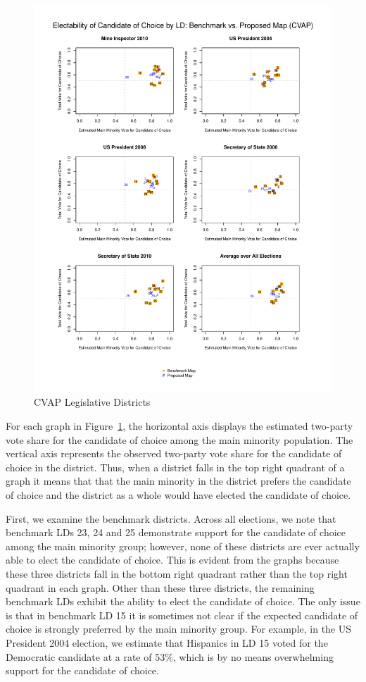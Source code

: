 \documentclass[12pt]{article}
\begin{document}
\begin{figure}[p!h]
\begin{center}
\includegraphics[scale=.8]{figs/cvap_ld.pdf}
\caption{\label{cvap_ld}CVAP Legislative Districts}
\end{center}
\end{figure}

For each graph in Figure~\ref{cvap_ld}, the horizontal axis displays the estimated two-party vote share for the candidate of choice among the main minority population. The vertical axis represents the observed two-party vote share for the candidate of choice in the district. Thus, when a district falls in the top right quadrant of a graph it means that that the main minority in the district prefers the candidate of choice and the district as a whole would have elected the candidate of choice. 

First, we examine the benchmark districts. Across all elections, we note that benchmark LDs 23, 24 and 25 demonstrate support for the candidate of choice among the main minority group; however, none of these districts are ever actually able to elect the candidate of choice. This is evident from the graphs because these three districts fall in the bottom right quadrant rather than the top right quadrant in each graph. Other than these three districts, the remaining benchmark LDs exhibit the ability to elect the candidate of choice. The only issue is that in benchmark LD 15 it is sometimes not clear if the expected candidate of choice is strongly preferred by the main minority group. For example, in the US President 2004 election, we estimate that Hispanics in LD 15 voted for the Democratic candidate at a rate of 53\%, which is by no means overwhelming support for the candidate of choice. 
\end{document}
